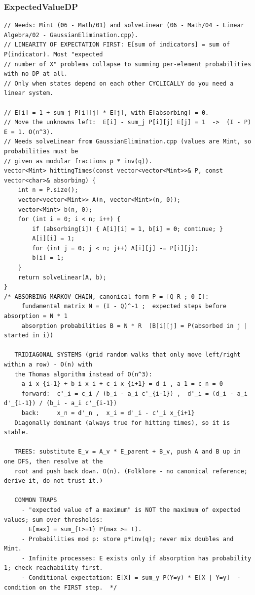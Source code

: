 \documentclass[9pt,a4paper,twocolumn]{extarticle}
\begin{document}
\filbreak
\subsubsection{ExpectedValueDP}
\nopagebreak
\begin{lstlisting}
// Needs: Mint (06 - Math/01) and solveLinear (06 - Math/04 - Linear Algebra/02 - GaussianElimination.cpp).
// LINEARITY OF EXPECTATION FIRST: E[sum of indicators] = sum of P(indicator). Most "expected
// number of X" problems collapse to summing per-element probabilities with no DP at all.
// Only when states depend on each other CYCLICALLY do you need a linear system.

// E[i] = 1 + sum_j P[i][j] * E[j], with E[absorbing] = 0.
// Move the unknowns left:  E[i] - sum_j P[i][j] E[j] = 1  ->  (I - P) E = 1. O(n^3).
// Needs solveLinear from GaussianElimination.cpp (values are Mint, so probabilities must be
// given as modular fractions p * inv(q)).
vector<Mint> hittingTimes(const vector<vector<Mint>>& P, const vector<char>& absorbing) {
    int n = P.size();
    vector<vector<Mint>> A(n, vector<Mint>(n, 0));
    vector<Mint> b(n, 0);
    for (int i = 0; i < n; i++) {
        if (absorbing[i]) { A[i][i] = 1, b[i] = 0; continue; }
        A[i][i] = 1;
        for (int j = 0; j < n; j++) A[i][j] -= P[i][j];
        b[i] = 1;
    }
    return solveLinear(A, b);
}
/* ABSORBING MARKOV CHAIN, canonical form P = [Q R ; 0 I]:
     fundamental matrix N = (I - Q)^-1 ;  expected steps before absorption = N * 1
     absorption probabilities B = N * R  (B[i][j] = P(absorbed in j | started in i))

   TRIDIAGONAL SYSTEMS (grid random walks that only move left/right within a row) - O(n) with
   the Thomas algorithm instead of O(n^3):
     a_i x_{i-1} + b_i x_i + c_i x_{i+1} = d_i , a_1 = c_n = 0
     forward:  c'_i = c_i / (b_i - a_i c'_{i-1}) ,  d'_i = (d_i - a_i d'_{i-1}) / (b_i - a_i c'_{i-1})
     back:     x_n = d'_n ,  x_i = d'_i - c'_i x_{i+1}
   Diagonally dominant (always true for hitting times), so it is stable.

   TREES: substitute E_v = A_v * E_parent + B_v, push A and B up in one DFS, then resolve at the
   root and push back down. O(n). (Folklore - no canonical reference; derive it, do not trust it.)

   COMMON TRAPS
     - "expected value of a maximum" is NOT the maximum of expected values; sum over thresholds:
       E[max] = sum_{t>=1} P(max >= t).
     - Probabilities mod p: store p*inv(q); never mix doubles and Mint.
     - Infinite processes: E exists only if absorption has probability 1; check reachability first.
     - Conditional expectation: E[X] = sum_y P(Y=y) * E[X | Y=y]  - condition on the FIRST step.  */
\end{lstlisting}
\end{document}
